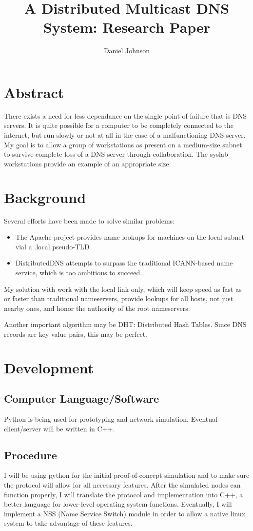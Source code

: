 \documentclass[12pt,letterpaper]{report}
\begin{document}
\author{Daniel Johnson}
\title{A Distributed Multicast DNS System: Research Paper}
\maketitle
\chapter{Abstract}
There exists a need for less dependance on the single point of failure that is DNS servers. It is quite possible for a computer to be completely connected to the internet, but run slowly or not at all in the case of a malfunctioning DNS server. My goal is to allow a group of workstations as present on a medium-size subnet to survive complete loss of a DNS server through collaboration. The syslab workstations provide an example of an appropriate size.
\chapter{Background}
Several efforts have been made to solve similar problems:
\begin{itemize}
\item The Apache project provides name lookups for machines on the local subnet vial a .local pseudo-TLD
\item DistributedDNS attempts to surpass the traditional ICANN-based name service, which is too ambitious to succeed.
\end{itemize}
My solution with work with the local link only, which will keep speed as fast as or faster than traditional nameservers, provide lookups for all hosts, not just nearby ones, and honor the authority of the root nameservers.

Another important algorithm may be DHT: Distributed Hash Tables. Since DNS records are key-value pairs, this may be perfect.
\chapter{Development}
\section{Computer Language/Software}
Python is being used for prototyping and network simulation. Eventual client/server will be written in C++.
\section{Procedure}
I will be using python for the initial proof-of-concept simulation and to make sure the protocol will allow for all necessary features. After the simulated nodes can function properly, I will translate the protocol and implementation into C++, a better language for lower-level operating system functions. Eventually, I will implement a NSS (Name Service Switch) module in order to allow a native linux system to take advantage of these features.
\end{document}
